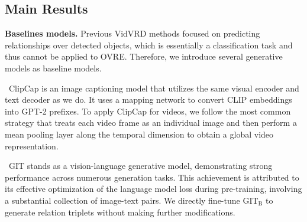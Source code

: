 \documentclass[letterpaper]{article}
\begin{document}
\subsection{Main Results}
\noindent\textbf{Baselines models. }
Previous VidVRD methods focused on predicting relationships over detected objects, which is essentially a classification task and thus cannot be applied to OVRE.
Therefore, we introduce several generative models as baseline models.

\textbullet  \ ClipCap \cite{mokady2021clipcap} is an image captioning model that utilizes the same visual encoder and text decoder as we do.
It uses a mapping network to convert CLIP embeddings into GPT-2 prefixes.
To apply ClipCap for videos, we follow the most common strategy that treats each video frame as an individual image and then perform a mean pooling layer along the temporal dimension to obtain a global video representation.

\textbullet  \ GIT \cite{wang2022git} stands as a vision-language generative model, demonstrating strong performance across numerous generation tasks. This achievement is attributed to its effective optimization of the language model loss during pre-training, involving a substantial collection of image-text pairs.
We directly fine-tune $\text{GIT}_{\text{B}}$ to generate relation triplets without making further modifications.




\end{document}

